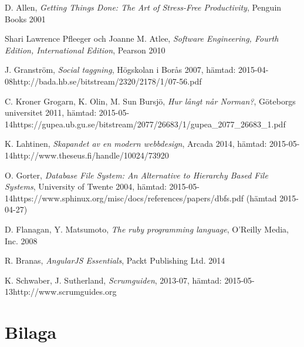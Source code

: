 \documentclass[a4paper,12pt,oneside,final]{extbook}
\begin{document}
\begin{thebibliography}{99}

  D. Allen, \emph{Getting Things Done: The Art of Stress-Free Productivity}, Penguin Books 2001
  
  Shari Lawrence Pfleeger och Joanne M. Atlee, \emph{Software Engineering, Fourth Edition, International Edition}, Pearson 2010

  J. Granström, \emph{Social taggning}, Högskolan i Borås 2007, hämtad: 2015-04-08\newline http://bada.hb.se/bitstream/2320/2178/1/07-56.pdf

  C. Kroner Grogarn, K. Olin, M. Sun Bursjö, \emph{Hur långt når Norman?}, Göteborgs universitet 2011, hämtad: 2015-05-14\newline https://gupea.ub.gu.se/bitstream/2077/26683/1/gupea\_2077\_26683\_1.pdf

  K. Lahtinen, \emph{Skapandet av en modern webbdesign}, Arcada 2014, hämtad: 2015-05-14\newline http://www.theseus.fi/handle/10024/73920

  O. Gorter, \emph{Database File System: An Alternative to Hierarchy Based File Systems}, University of Twente 2004, hämtad: 2015-05-14\newline https://www.sphinux.org/misc/docs/references/papers/dbfs.pdf (hämtad 2015-04-27)

  D. Flanagan, Y. Matsumoto, \emph{The ruby programming language}, O'Reilly Media, Inc. 2008

  R. Branas, \emph{AngularJS Essentials}, Packt Publishing Ltd. 2014


 K. Schwaber, J. Sutherland, \emph{Scrumguiden}, 2013-07, hämtad: 2015-05-13\newline http://www.scrumguides.org

\bibitem{}
\bibitem{}
\bibitem{}
\bibitem{}
\bibitem{}
\bibitem{}
\bibitem{}
\bibitem{}
\bibitem{}
\bibitem{}
\bibitem{}

\end{thebibliography}


\appendix

\chapter{Bilaga}
\end{document}
